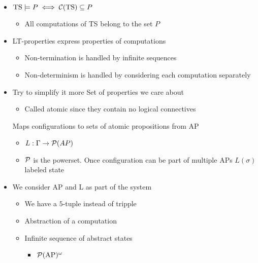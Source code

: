\begin{itemize}
\begin{itemize}
            \item $\text{TS} \models P \iff \mathcal{C}(\text{TS}) \subseteq P$
                \begin{itemize}
                    \item All computations of TS belong to the set $P$
                \end{itemize}
            \item LT-properties express properties of computations
                \begin{itemize}
                    \item Non-termination is handled by infinite sequences
                    \item Non-determinism is handled by considering each computation separately
                \end{itemize}
            \item Try to simplify it more
             Set of properties we care about
                \begin{itemize}
                    \item Called atomic since they contain no logical connectives
                \end{itemize}
             Maps configurations to sets of atomic propositions from AP
                \begin{itemize}
                    \item $L : \Gamma \to \mathcal{P}(AP)$
                    \item $\mathcal{P}$ is the powerset. Once configuration can be  part of multiple APs
                     $L(\sigma)$ labeled state
                \end{itemize}
            \item We consider AP and L as part of the system
                \begin{itemize}
                    \item We have a $5$-tuple instead of tripple
                \end{itemize}
                \begin{itemize}
                    \item Abstraction of a computation
                    \item Infinite sequence of abstract states
                        \begin{itemize}
                            \item $\mathcal{P}(\text{AP})^\omega$

\end{itemize}
\end{itemize}
\end{itemize}
\end{itemize}
